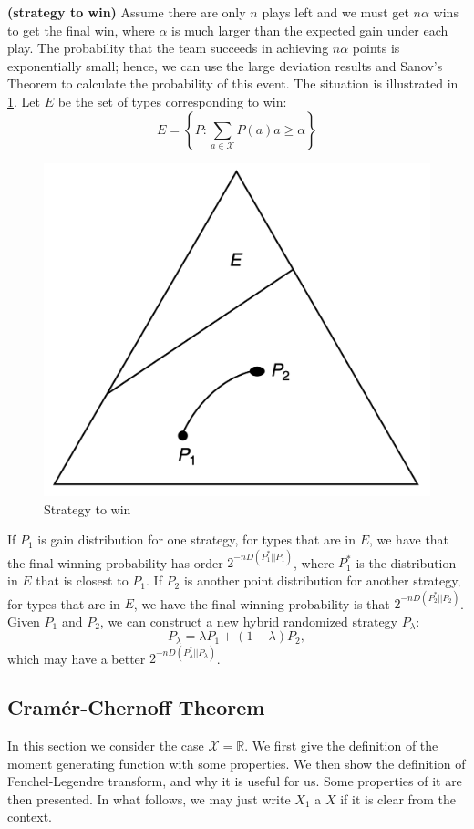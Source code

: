 \documentclass{article}
\newcommand{\bfs}[1]{\textbf{({#1})}}
\begin{document}
\begin{exma}{\bfs{strategy to win}}
Assume there are only $n$ plays left and we must get $ n \alpha$ wins to get the final win, where $\alpha$ is much larger than the expected gain under each play. The probability that the team succeeds in achieving $ n \alpha$  points is exponentially small; hence, we can use the large deviation results and Sanov's Theorem to calculate the probability of this event. The situation is illustrated in \cref{ht:fig2}. Let $E$ be the set of types corresponding to win:
$$
E=\left\{P: \sum_{a \in \mathcal{X}} P(a) a \geq \alpha\right\}
$$
\begin{figure}[ht]
 \centering
 \includegraphics[width=0.5\linewidth]{Figs/fig7.png}
\centering
\caption{Strategy to win}
		\label{ht:fig2}
\end{figure}

If $P_{1}$ is gain distribution for one strategy, for types that are in $E$, we have that the final winning probability has order $2^{-n D\left(P_{1}^{*}|| P_{1}\right)}$, where $P_{1}^{*}$ is the distribution in $E$ that is closest to $P_{1}$.
If $P_{2}$ is another point distribution for another strategy, for  types that are in $E$, we have the final winning probability is that $2^{-n D\left(P_{2}^{*}|| P_{2}\right)}$. Given $P_{1}$ and $P_{2}$, we can construct a new hybrid randomized strategy $P_\lambda$: 
 $$P_\lambda = \lambda P_1 + (1-\lambda) P_2,$$
 which may have a better $2^{-n D\left(P_{\lambda}^{*}|| P_{\lambda}\right)}$.
\end{exma}

\subsection{Cram\'{e}r-Chernoff Theorem}\label{ssect:ld_cramer}
In this section we consider the case $\mathcal{X}=\mathbb{R}$.
We first give the definition of the moment generating function with some properties. We then show the definition of Fenchel-Legendre transform, and why it is useful for us. Some properties of it are then presented. In what follows, we may just write $X_1$ a $X$ if it is clear from the context.
\end{document}
